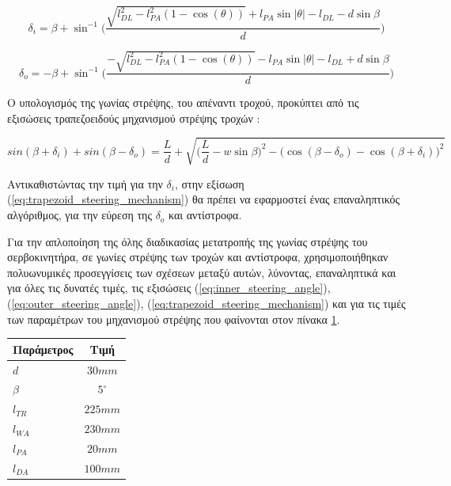 \begin{equation}
	\label{eq:inner_steering_angle}
	\delta_i = \beta + \sin^{-1}{ \Bigg(
		\frac{
		\sqrt{l_{DL}^2 - l_{PA}^2(1-\cos(\theta))} + l_{PA} \sin{|\theta|} - l_{DL} - d \sin{\beta}}{d}} \Bigg)
\end{equation}

\begin{equation}
	\label{eq:outer_steering_angle}
	\delta_o = -\beta + \sin^{-1}{ \Bigg(
		\frac{
		-\sqrt{l_{DL}^2 - l_{PA}^2(1-\cos(\theta))} - l_{PA} \sin{|\theta|} - l_{DL} + d \sin{\beta}}{d}} \Bigg)
\end{equation}

\bigskip
Ο υπολογισμός της γωνίας στρέψης, του απέναντι τροχού, προκύπτει από τις εξισώσεις {τραπεζοειδούς μηχανισμού στρέψης τροχών} \cite{vehicle_dynamics}:

\begin{equation}
	\label{eq:trapezoid_steering_mechanism}
	sin(\beta + \delta_i) + sin(\beta - \delta_o) = \frac{L}{d} + \sqrt{\big(\frac{L}{d} - w \sin{\beta} \big)^2 - \big(\cos{(\beta-\delta_o)} - \cos{(\beta+\delta_i)}\big)^2}
\end{equation}

\bigskip
Αντικαθιστώντας την τιμή για την $\delta_i$, στην εξίσωση (\ref{eq:trapezoid_steering_mechanism}) θα πρέπει να εφαρμοστεί ένας επαναληπτικός αλγόριθμος, για την εύρεση της $\delta_o$ και αντίστροφα.

\bigskip
Για την απλοποίηση της όλης διαδικασίας μετατροπής της γωνίας στρέψης του σερβοκινητήρα, σε γωνίες στρέψης των τροχών και αντίστροφα, χρησιμοποιήθηκαν πολυωνυμικές προσεγγίσεις των σχέσεων μεταξύ αυτών, λύνοντας, επαναληπτικά και για όλες τις δυνατές τιμές, τις εξισώσεις (\ref{eq:inner_steering_angle}), (\ref{eq:outer_steering_angle}), (\ref{eq:trapezoid_steering_mechanism}) και για τις τιμές των παραμέτρων του μηχανισμού στρέψης που φαίνονται στον πίνακα \ref{tab:steering_parameter_values}.

\bigskip
\begin{table}[!ht]
	\centering
	\begin{tabular}{| l | c |}
		\hline
		\textbf{Παράμετρος} & \textbf{Τιμή}\\ \hline
		$d$ & $30mm$ \\ \hline
		$\beta$ & $5^\circ$\\ \hline
		$l_{TR}$ & $225mm$\\ \hline
		$l_{WA}$ & $230mm$\\ \hline
		$l_{PA}$ & $20mm$\\ \hline
		$l_{DA}$ & $100mm$\\ \hline
	\end{tabular}
	\label{tab:steering_parameter_values}
\end{table}


